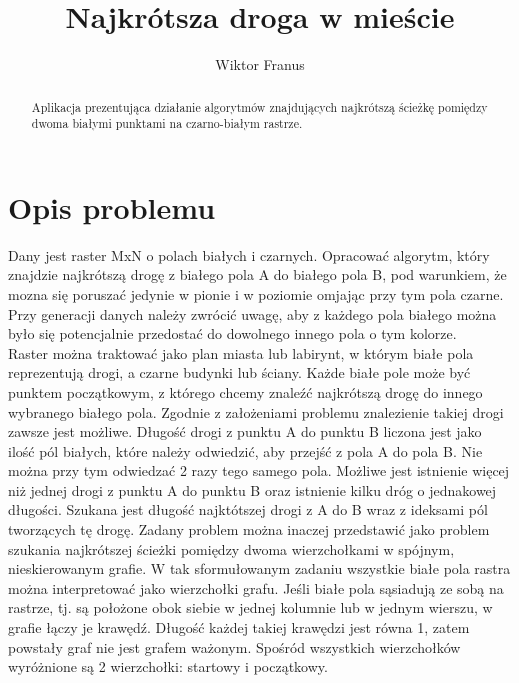 \documentclass[11pt,a4paper]{article}
\title{Najkrótsza droga w mieście}
\author{Wiktor Franus}
\begin{document}
\maketitle

\begin{abstract}
	\begin{center}
	Aplikacja prezentująca działanie algorytmów znajdujących najkrótszą ścieżkę
	pomiędzy dwoma białymi punktami na czarno-białym rastrze.
	\end{center}
\end{abstract}

\tableofcontents
\newpage

\section{Opis problemu}
Dany jest raster MxN o polach białych i czarnych. Opracować algorytm, który znajdzie najkrótszą drogę z
białego pola A do białego pola B, pod warunkiem, że mozna się poruszać jedynie w pionie i w poziomie
omjając przy tym pola czarne. Przy generacji danych należy zwrócić uwagę, aby z każdego pola białego
można było się potencjalnie przedostać do dowolnego innego pola o tym kolorze.\\
Raster można traktować jako plan miasta lub labirynt, w którym białe pola reprezentują drogi, a czarne
budynki lub ściany. Każde białe pole może być punktem początkowym, z którego chcemy znaleźć najkrótszą
drogę do innego wybranego białego pola. Zgodnie z założeniami problemu znalezienie takiej drogi zawsze
jest możliwe. Długość drogi z punktu A do punktu B liczona jest jako ilość pól białych, które należy
odwiedzić, aby przejść z pola A do pola B. Nie można przy tym odwiedzać 2 razy tego samego pola.
Możliwe jest istnienie więcej niż jednej drogi z punktu A do punktu B oraz istnienie kilku dróg o jednakowej
długości. Szukana jest długość najktótszej drogi z A do B wraz z ideksami pól tworzących tę drogę.
Zadany problem można inaczej przedstawić jako problem szukania najkrótszej ścieżki pomiędzy dwoma
wierzchołkami w spójnym, nieskierowanym grafie.
W tak sformułowanym zadaniu wszystkie białe pola rastra można interpretować jako wierzchołki grafu. Jeśli
białe pola sąsiadują ze sobą na rastrze, tj. są położone obok siebie w jednej kolumnie lub w jednym wierszu,
w grafie łączy je krawędź. Długość każdej takiej krawędzi jest równa 1, zatem powstały graf nie jest grafem
ważonym. Spośród wszystkich wierzchołków wyróżnione są 2 wierzchołki: startowy i początkowy.
\end{document}
